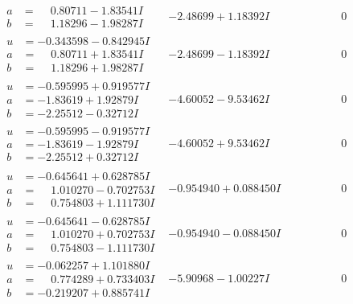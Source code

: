 \documentclass[1p]{elsarticle_modified}
\theoremstyle{definition}
\begin{document}
$$\begin{array}{c|c|c}
\begin{aligned}
a &= \phantom{-}0.80711 - 1.83541 I \\
b &= \phantom{-}1.18296 - 1.98287 I\end{aligned}
 & -2.48699 + 1.18392 I & \phantom{-0.000000 } 0 \\ \hline\begin{aligned}
u &= -0.343598 - 0.842945 I \\
a &= \phantom{-}0.80711 + 1.83541 I \\
b &= \phantom{-}1.18296 + 1.98287 I\end{aligned}
 & -2.48699 - 1.18392 I & \phantom{-0.000000 } 0 \\ \hline\begin{aligned}
u &= -0.595995 + 0.919577 I \\
a &= -1.83619 + 1.92879 I \\
b &= -2.25512 - 0.32712 I\end{aligned}
 & -4.60052 - 9.53462 I & \phantom{-0.000000 } 0 \\ \hline\begin{aligned}
u &= -0.595995 - 0.919577 I \\
a &= -1.83619 - 1.92879 I \\
b &= -2.25512 + 0.32712 I\end{aligned}
 & -4.60052 + 9.53462 I & \phantom{-0.000000 } 0 \\ \hline\begin{aligned}
u &= -0.645641 + 0.628785 I \\
a &= \phantom{-}1.010270 - 0.702753 I \\
b &= \phantom{-}0.754803 + 1.111730 I\end{aligned}
 & -0.954940 + 0.088450 I & \phantom{-0.000000 } 0 \\ \hline\begin{aligned}
u &= -0.645641 - 0.628785 I \\
a &= \phantom{-}1.010270 + 0.702753 I \\
b &= \phantom{-}0.754803 - 1.111730 I\end{aligned}
 & -0.954940 - 0.088450 I & \phantom{-0.000000 } 0 \\ \hline\begin{aligned}
u &= -0.062257 + 1.101880 I \\
a &= \phantom{-}0.774289 + 0.733403 I \\
b &= -0.219207 + 0.885741 I\end{aligned}
 & -5.90968 - 1.00227 I & \phantom{-0.000000 } 0 \\ \hline\begin{aligned}

\end{aligned}
\end{array}$$
\end{document}
